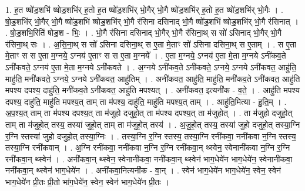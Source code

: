 \documentclass[17pt]{extarticle}
\begin{document}
1. ह॒त ष्षो॑ड॒शभि॑ ष्षोड॒शभि॑र् ह॒तो ह॒त ष्षो॑ड॒शभि॑र् भो॒गैर् भो॒गै ष्षो॑ड॒शभि॑र् ह॒तो ह॒त ष्षो॑ड॒शभि॑र् भो॒गैः । . षो॒ड॒शभि॑र् भो॒गैर् भो॒गै ष्षो॑ड॒शभि॑ ष्षोड॒शभि॑र् भो॒गै र॑सिना दसिनाद् भो॒गै ष्षो॑ड॒शभि॑ ष्षोड॒शभि॑र् भो॒गै र॑सिनात् । . षो॒ड॒शभि॒रिति॑ षोड॒श - भिः॒ । . भो॒गै र॑सिना दसिनाद् भो॒गैर् भो॒गै र॑सिना॒थ् स सो॑ ऽसिनाद् भो॒गैर् भो॒गै र॑सिना॒थ् सः । . अ॒सि॒ना॒थ् स सो॑ ऽसिना दसिना॒थ् स ए॒ता मे॒ताꣳ सो॑ ऽसिना दसिना॒थ् स ए॒ताम् । . स ए॒ता मे॒ताꣳ स स ए॒ता म॒ग्नये॒ ऽग्नय॑ ए॒ताꣳ स स ए॒ता म॒ग्नये᳚ । . ए॒ता म॒ग्नये॒ ऽग्नय॑ ए॒ता मे॒ता म॒ग्नये ऽनी॑कव॒ते ऽनी॑कवते॒ ऽग्नय॑ ए॒ता मे॒ता म॒ग्नये ऽनी॑कवते । . अ॒ग्नये ऽनी॑कव॒ते ऽनी॑कवते॒ ऽग्नये॒ ऽग्नये ऽनी॑कवत॒ आहु॑ति॒ माहु॑ति॒ मनी॑कवते॒ ऽग्नये॒ ऽग्नये ऽनी॑कवत॒ आहु॑तिम् । . अनी॑कवत॒ आहु॑ति॒ माहु॑ति॒ मनी॑कव॒ते ऽनी॑कवत॒ आहु॑ति मपश्य दपश्य॒ दाहु॑ति॒ मनी॑कव॒ते ऽनी॑कवत॒ आहु॑ति मपश्यत् । . अनी॑कवत॒ इत्यनी॑क - व॒ते॒ । . आहु॑ति मपश्य दपश्य॒ दाहु॑ति॒ माहु॑ति मपश्य॒त् ताम् ता म॑पश्य॒ दाहु॑ति॒ माहु॑ति मपश्य॒त् ताम् । . आहु॑ति॒मित्या - हु॒ति॒म् । . अ॒प॒श्य॒त् ताम् ता म॑पश्य दपश्य॒त् ता म॑जुहो दजुहो॒त् ता म॑पश्य दपश्य॒त् ता म॑जुहोत् । . ता म॑जुहो दजुहो॒त् ताम् ता म॑जुहो॒त् तस्य॒ तस्या॑ जुहो॒त् ताम् ता म॑जुहो॒त् तस्य॑ । . अ॒जु॒हो॒त् तस्य॒ तस्या॑ जुहो दजुहो॒त् तस्या॒ग्नि र॒ग्नि स्तस्या॑ जुहो दजुहो॒त् तस्या॒ग्निः । . तस्या॒ग्नि र॒ग्नि स्तस्य॒ तस्या॒ग्नि रनी॑कवा॒ ननी॑कवा न॒ग्नि स्तस्य॒ तस्या॒ग्नि रनी॑कवान् । . अ॒ग्नि रनी॑कवा॒ ननी॑कवा न॒ग्नि र॒ग्नि रनी॑कवा॒न् थ्स्वेन॒ स्वेनानी॑कवा न॒ग्नि र॒ग्नि रनी॑कवा॒न् थ्स्वेन॑ । . अनी॑कवा॒न् थ्स्वेन॒ स्वेनानी॑कवा॒ ननी॑कवा॒न् थ्स्वेन॑ भाग॒धेये॑न भाग॒धेये॑न॒ स्वेनानी॑कवा॒ ननी॑कवा॒न् थ्स्वेन॑ भाग॒धेये॑न । . अनी॑कवा॒नित्यनी॑क - वा॒न् । . स्वेन॑ भाग॒धेये॑न भाग॒धेये॑न॒ स्वेन॒ स्वेन॑ भाग॒धेये॑न प्री॒तः प्री॒तो भा॑ग॒धेये॑न॒ स्वेन॒ स्वेन॑ भाग॒धेये॑न प्री॒तः । \newline
\end{document}
